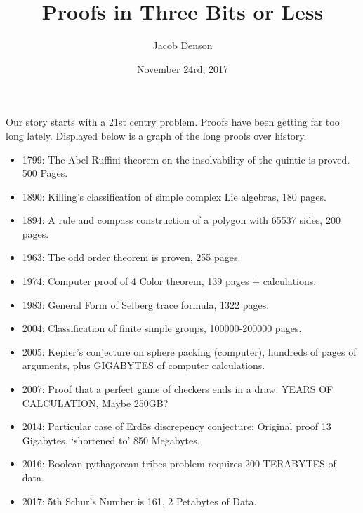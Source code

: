 \documentclass{article}
\title{Proofs in Three Bits or Less}
\author{Jacob Denson}
\date{November 24rd, 2017}
\theoremstyle{plain}
\theoremstyle{definition}
\begin{document}
\maketitle

Our story starts with a 21st centry problem. Proofs have been getting far too long lately. Displayed below is a graph of the long proofs over history.
%
\begin{itemize}
    \item 1799: The Abel-Ruffini theorem on the insolvability of the quintic is proved. 500 Pages.
    \item 1890: Killing's classification of simple complex Lie algebras, 180 pages.
    \item 1894: A rule and compass construction of a polygon with 65537 sides, 200 pages.
    \item 1963: The odd order theorem is proven, 255 pages.
    \item 1974: Computer proof of 4 Color theorem, 139 pages + calculations.
    \item 1983: General Form of Selberg trace formula, 1322 pages.
    \item 2004: Classification of finite simple groups, 100000-200000 pages.
    \item 2005: Kepler's conjecture on sphere packing (computer), hundreds of pages of arguments, plus GIGABYTES of computer calculations.
    \item 2007: Proof that a perfect game of checkers ends in a draw. YEARS OF CALCULATION, Maybe 250GB?
    \item 2014: Particular case of Erd\"{o}s discrepency conjecture: Original proof 13 Gigabytes, `shortened to' 850 Megabytes.
    \item 2016: Boolean pythagorean tribes problem requires 200 TERABYTES of data.
    \item 2017: 5th Schur's Number is 161, 2 Petabytes of Data.
\end{itemize}
\end{document}
